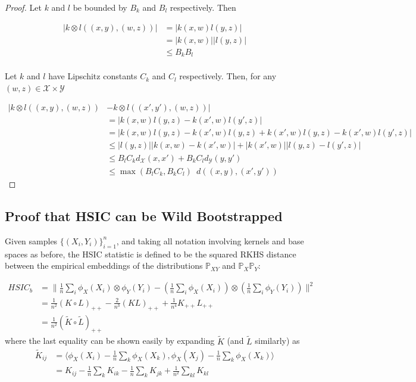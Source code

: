 \documentclass[]{article}
\begin{document}
\begin{proof} Let $k$ and $l$ be bounded by $B_k$ and $B_l$ respectively. Then 

\begin{align*}
|k \otimes l \left( (x,y), (w,z) \right)| &= |k(x,w)l(y,z)| \\
&= |k(x,w)||l(y,z)| \\
&\leq B_k B_l \\
\end{align*}

Let $k$ and $l$ have Lipschitz constants $C_k$ and $C_l$ respectively. Then, for any $(w,z) \in \mathcal{X\times Y}$

\begin{align*}
|k \otimes l \left( (x,y), (w,z) \right) &- k \otimes l \left( (x',y'), (w,z) \right) |  \\
& = |k(x,w)l(y,z) - k(x',w)l(y',z)| \\
& = |k(x,w)l(y,z) - k(x',w)l(y,z) + k(x',w)l(y,z) - k(x',w)l(y',z)| \\
& \leq |l(y,z)| |k(x,w) - k(x',w)| + |k(x',w)||l(y,z) - l(y',z)| \\
& \leq B_l C_k d_\mathcal{X}(x,x') + B_k C_l d_\mathcal{Y}(y,y') \\
& \leq \max(B_l C_k, B_k C_l )  \enspace d\left((x,y),(x',y')\right) 
\end{align*}

\end{proof}

\subsection{Proof that HSIC can be Wild Bootstrapped}

Given samples $\{(X_i,Y_i)\}_{i=1}^n$, and taking all notation involving kernels and base spaces as before, the HSIC statistic is defined to be the squared RKHS distance between the empirical embeddings of the distributions $\mathbb{P}_{XY}$ and $\mathbb{P}_X\mathbb{P}_Y$:

\begin{align*}
HSIC_b & = \| \frac{1}{n}\sum_i \phi_X(X_i) \otimes \phi_Y(Y_i) - \left(\frac{1}{n}\sum_i \phi_X(X_i)\right) \otimes \left(\frac{1}{n}\sum_i \phi_Y(Y_i) \right)\|^2 \\
& = \frac{1}{n^2} (K\circ L)_{++}  - \frac{2}{n^3}(KL)_{++} + \frac{1}{n^4}K_{++}L_{++} \\
& = \frac{1}{n^2}(\tilde{K}\circ \tilde{L})_{++}
\end{align*}
where the last equality can be shown easily by expanding $\tilde{K}$ (and $\tilde{L}$ similarly) as
\begin{align*}
\tilde{K}_{ij} &= \langle\phi_X(X_i)- \frac{1}{n}\sum_k\phi_X(X_k),\phi_X(X_j) - \frac{1}{n}\sum_k\phi_X(X_k)\rangle \\
&= K_{ij} - \frac{1}{n}\sum_kK_{ik} - \frac{1}{n}\sum_kK_{jk} + \frac{1}{n^2}\sum_{kl}K_{kl}
\end{align*} 
\end{document}
